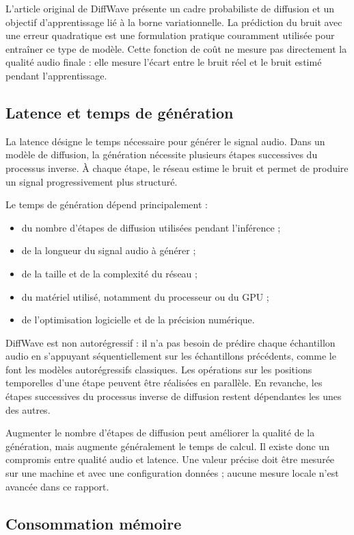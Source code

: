 L'article original de DiffWave présente un cadre probabiliste de diffusion et un objectif d'apprentissage lié à la borne variationnelle. La prédiction du bruit avec une erreur quadratique est une formulation pratique couramment utilisée pour entraîner ce type de modèle. Cette fonction de coût ne mesure pas directement la qualité audio finale : elle mesure l'écart entre le bruit réel et le bruit estimé pendant l'apprentissage.

\subsection{Latence et temps de génération}

La latence désigne le temps nécessaire pour générer le signal audio. Dans un modèle de diffusion, la génération nécessite plusieurs étapes successives du processus inverse. À chaque étape, le réseau estime le bruit et permet de produire un signal progressivement plus structuré.

Le temps de génération dépend principalement :
\begin{itemize}
    \item du nombre d'étapes de diffusion utilisées pendant l'inférence ;
    \item de la longueur du signal audio à générer ;
    \item de la taille et de la complexité du réseau ;
    \item du matériel utilisé, notamment du processeur ou du GPU ;
    \item de l'optimisation logicielle et de la précision numérique.
\end{itemize}

DiffWave est non autorégressif : il n'a pas besoin de prédire chaque échantillon audio en s'appuyant séquentiellement sur les échantillons précédents, comme le font les modèles autorégressifs classiques. Les opérations sur les positions temporelles d'une étape peuvent être réalisées en parallèle. En revanche, les étapes successives du processus inverse de diffusion restent dépendantes les unes des autres.

Augmenter le nombre d'étapes de diffusion peut améliorer la qualité de la génération, mais augmente généralement le temps de calcul. Il existe donc un compromis entre qualité audio et latence. Une valeur précise doit être mesurée sur une machine et avec une configuration données ; aucune mesure locale n'est avancée dans ce rapport.

\subsection{Consommation mémoire}

